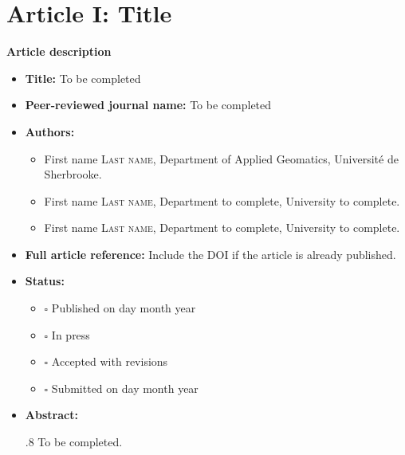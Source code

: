 \chapter{Article I: Title} \label{chap:article1}

{\large \textbf{Article description}}

\begin{itemize}
  \item \textbf{Title:} To be completed

  \item \textbf{Peer-reviewed journal name:} To be completed

  \item \textbf{Authors:}
    \begin{itemize}
    \item First name \textsc{Last name}, Department of Applied Geomatics, Université de Sherbrooke.
    \item First name \textsc{Last name}, Department to complete, University to complete.
    \item First name \textsc{Last name}, Department to complete, University to complete.
  \end{itemize}
  \item \textbf{Full article reference:} Include the DOI if the article is already published.

  \item \textbf{Status:}
        \begin{itemize}
            \item $\square$ Published on day month year
            \item $\square$ In press
            \item $\square$ Accepted with revisions
            \item $\square$ Submitted on day month year
   \end{itemize}

  \item \textbf{Abstract:} \begin{spacing}{.8}
  \small To be completed.
  \end{spacing}
\end{itemize}


